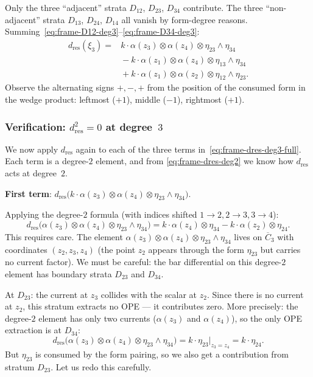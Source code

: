 Only the three ``adjacent'' strata $D_{12}$, $D_{23}$, $D_{34}$
contribute.  The three ``non-adjacent'' strata $D_{13}$, $D_{24}$,
$D_{14}$ all vanish by form-degree reasons.
Summing~\eqref{eq:frame-D12-deg3}--\eqref{eq:frame-D34-deg3}:
\begin{equation}\label{eq:frame-dres-deg3-full}
\boxed{\begin{aligned}
d_{\mathrm{res}}(\xi_3)
={} & k \cdot \alpha(z_3) \otimes \alpha(z_4)
    \otimes \eta_{23} \wedge \eta_{34} \\
  & {} - k \cdot \alpha(z_1) \otimes \alpha(z_4)
    \otimes \eta_{13} \wedge \eta_{34} \\
  & {} + k \cdot \alpha(z_1) \otimes \alpha(z_2)
    \otimes \eta_{12} \wedge \eta_{23}.
\end{aligned}}
\end{equation}
Observe the alternating signs $+, -, +$ from the position of the
consumed form in the wedge product: leftmost ($+1$), middle
($-1$), rightmost ($+1$).

\subsubsection*{Verification: $d_{\mathrm{res}}^2 = 0$ at degree~$3$}

We now apply $d_{\mathrm{res}}$ again to each of the three terms
in~\eqref{eq:frame-dres-deg3-full}.
Each term is a degree-$2$ element, and from
\eqref{eq:frame-dres-deg2} we know how $d_{\mathrm{res}}$ acts
at degree~$2$.

\medskip
\noindent\textbf{First term}: $d_{\mathrm{res}}\bigl(
k \cdot \alpha(z_3) \otimes \alpha(z_4)
\otimes \eta_{23} \wedge \eta_{34}\bigr)$.

Applying the degree-$2$ formula (with indices shifted
$1 \to 2, 2 \to 3, 3 \to 4$):
\begin{equation}\label{eq:frame-dsq-term1}
d_{\mathrm{res}}\bigl(\alpha(z_3) \otimes \alpha(z_4)
  \otimes \eta_{23} \wedge \eta_{34}\bigr)
= k \cdot \alpha(z_4) \otimes \eta_{34}
  - k \cdot \alpha(z_2) \otimes \eta_{24}.
\end{equation}
This requires care.  The element
$\alpha(z_3) \otimes \alpha(z_4) \otimes \eta_{23} \wedge \eta_{34}$
lives on $\overline{C}_3$ with coordinates $(z_2, z_3, z_4)$
(the point $z_2$ appears through the form $\eta_{23}$ but carries
no current factor).  We must be careful: the bar differential
on this degree-$2$ element has boundary strata $D_{23}$
and $D_{34}$.

At $D_{23}$: the current at $z_3$ collides with the scalar at
$z_2$.  Since there is no current at $z_2$, this stratum extracts
no OPE --- it contributes zero.  More precisely: the degree-$2$
element has only two currents ($\alpha(z_3)$ and $\alpha(z_4)$),
so the only OPE extraction is at $D_{34}$:
\begin{equation}\label{eq:frame-dsq-term1-corrected}
d_{\mathrm{res}}\bigl(
  \alpha(z_3) \otimes \alpha(z_4)
  \otimes \eta_{23} \wedge \eta_{34}\bigr)
= k \cdot \eta_{23}|_{z_3 = z_4}
= k \cdot \eta_{24}.
\end{equation}
But $\eta_{23}$ is consumed by the form pairing, so we
also get a contribution from stratum $D_{23}$.  Let us
redo this carefully.

